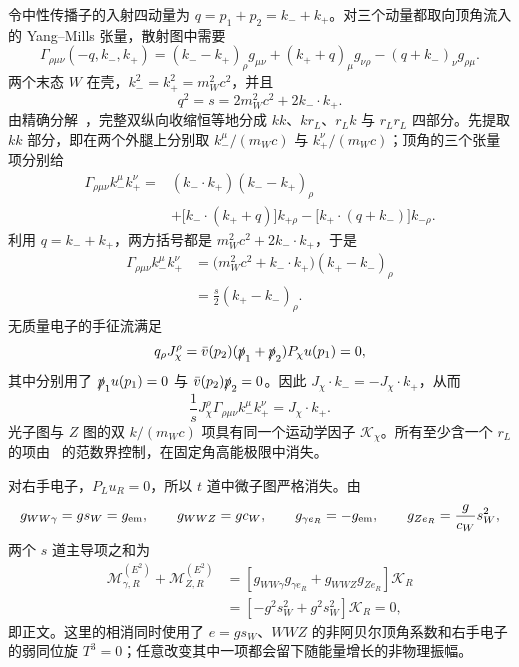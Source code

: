 \begin{derivation}[右手电子通道中的高能抵消]
令中性传播子的入射四动量为 $q=p_1+p_2=k_-+k_+$。对三个动量都取向顶角流入的 Yang--Mills 张量，散射图中需要
\begin{equation*}
\Gamma_{\rho\mu\nu}(-q,k_-,k_+)
=(k_--k_+)_\rho g_{\mu\nu}
 +(k_++q)_\mu g_{\nu\rho}
 -(q+k_-)_\nu g_{\rho\mu}.
\end{equation*}
两个末态 $W$ 在壳，$k_-^2=k_+^2=m_W^2c^2$，并且
\begin{equation*}
q^2=s=2m_W^2c^2+2k_-\!\cdot k_+.
\end{equation*}
由精确分解~，完整双纵向收缩恒等地分成 $kk$、$kr_L$、$r_Lk$ 与 $r_Lr_L$ 四部分。先提取 $kk$ 部分，即在两个外腿上分别取 $k_-^\mu/(m_Wc)$ 与 $k_+^\nu/(m_Wc)$；顶角的三个张量项分别给
\begin{align*}
\Gamma_{\rho\mu\nu}k_-^\mu k_+^\nu
={}&(k_-\!\cdot k_+)(k_--k_+)_\rho\\
&+\bigl[k_-\!\cdot(k_++q)\bigr]k_{+\rho}
-\bigl[k_+\!\cdot(q+k_-)\bigr]k_{-\rho}.
\end{align*}
利用 $q=k_-+k_+$，两方括号都是 $m_W^2c^2+2k_-\!\cdot k_+$，于是
\begin{align*}
\Gamma_{\rho\mu\nu}k_-^\mu k_+^\nu
&=\bigl(m_W^2c^2+k_-\!\cdot k_+\bigr)(k_+-k_-)_\rho\\
&=\frac{s}{2}(k_+-k_-)_\rho .
\end{align*}
无质量电子的手征流满足
\begin{equation*}
q_\rho J_\chi^\rho
=\bar v(p_2)(\slashed p_1+\slashed p_2)P_\chi u(p_1)=0,
\end{equation*}
其中分别用了 $\slashed p_1u(p_1)=0$ 与 $\bar v(p_2)\slashed p_2=0$。因此 $J_\chi\!\cdot k_-=-J_\chi\!\cdot k_+$，从而
\begin{equation*}
\frac{1}{s}J_\chi^\rho
\Gamma_{\rho\mu\nu}k_-^\mu k_+^\nu
=J_\chi\!\cdot k_+.
\end{equation*}
光子图与 $Z$ 图的双 $k/(m_Wc)$ 项具有同一个运动学因子 $\mathcal K_\chi$。所有至少含一个 $r_L$ 的项由~ 的范数界控制，在固定角高能极限中消失。

对右手电子，$P_Lu_R=0$，所以 $t$ 道中微子图严格消失。由
\begin{equation*}
g_{WW\gamma}=gs_W=g_{\rm em},\qquad
 g_{WWZ}=gc_W,\qquad
 g_{\gamma e_R}=-g_{\rm em},\qquad
 g_{Ze_R}=\frac{g}{c_W}s_W^2,
\end{equation*}
两个 $s$ 道主导项之和为
\begin{align*}
\mathcal M_{\gamma,R}^{(E^2)}+\mathcal M_{Z,R}^{(E^2)}
&=\left[g_{WW\gamma}g_{\gamma e_R}+g_{WWZ}g_{Ze_R}\right]\mathcal K_R\\
&=\left[-g^2s_W^2+g^2s_W^2\right]\mathcal K_R=0,
\end{align*}
即正文。这里的相消同时使用了 $e=gs_W$、$WWZ$ 的非阿贝尔顶角系数和右手电子的弱同位旋 $T^3=0$；任意改变其中一项都会留下随能量增长的非物理振幅。
\end{derivation}

